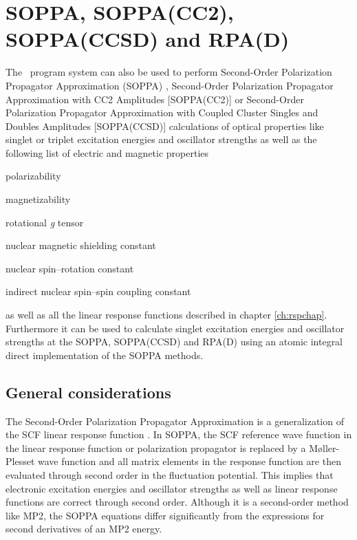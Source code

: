 \chapter{SOPPA, SOPPA(CC2), SOPPA(CCSD) and RPA(D)}\label{ch:soppa}

The \dalton\ program system can also be used to perform Second-Order
Polarization Propagator Approximation (SOPPA) 
\cite{esnpjjodjcp73,mjpekdtehjajjojcp,spascpl260,tejospastcan100,spas037},
Second-Order Polarization Propagator Approximation with CC2 Amplitudes
[SOPPA(CC2)]  \cite{spas097} or Second-Order
Polarization Propagator Approximation with Coupled Cluster Singles and
Doubles Amplitudes [SOPPA(CCSD)]  \cite{soppaccsd}
calculations of optical properties like singlet or triplet excitation
energies and oscillator
strengths as well as the following list of
electric and magnetic properties
\begin{center}
\begin{list}{}{}
\item polarizability
\item magnetizability
\item rotational {\em g} tensor
\item nuclear magnetic shielding constant
\item nuclear spin--rotation constant
\item indirect nuclear spin--spin coupling constant
\end{list}
\end{center}
as well as all the linear response functions described in chapter
\ref{ch:rspchap}. Furthermore it can be used to calculate singlet
excitation energies and oscillator
strengths at the SOPPA,\cite{spas037}
SOPPA(CCSD) \cite{spas089} and RPA(D) \cite{spas025}
using an atomic integral direct implementation of the SOPPA methods.


\section{General considerations}\label{sec:soppageneral}

The Second-Order Polarization Propagator Approximation is a
generalization of the SCF linear response function \cite{esnpjjodjcp73,
jopjdycpr2, mjpekdtehjajjojcp, spas037}. In SOPPA, the SCF reference
wave function in the linear response function or polarization
propagator is replaced by a M{\o}ller-Plesset wave function and all
matrix elements in the response function are then evaluated through
second order in the fluctuation potential. This implies that electronic
excitation energies and oscillator strengths as well as linear response
functions are correct through second order. Although it is a
second-order method like MP2, the SOPPA equations differ significantly
from the expressions for second derivatives of an MP2 energy.

